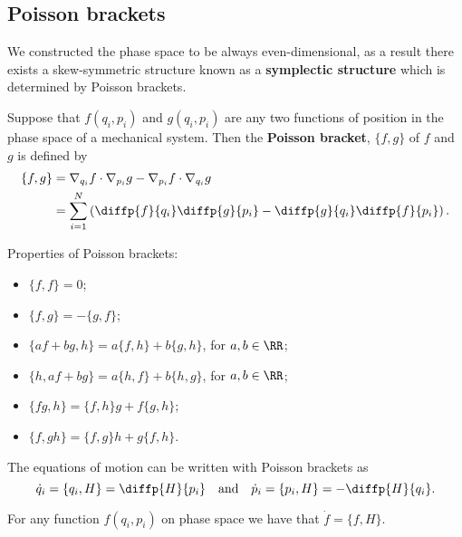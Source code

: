 \documentclass[12pt, a4paper]{article}
\begin{document}
\subsection{Poisson brackets}

We constructed the phase space to be always even-dimensional, as a result there exists a skew-symmetric structure known as a \textbf{symplectic structure} which is determined by Poisson brackets.

\begin{definition}
    Suppose that \(f(q_i,p_i)\) and \(g(q_i,p_i)\) are any two functions of position in the phase space of a mechanical system. Then the \textbf{Poisson bracket}, \(\{f,g\}\) of \(f\) and \(g\) is defined by 
    \[\begin{aligned}
        \{f,g\} &= \nabla_{q_i} f \cdot \nabla_{p_i} g - \nabla_{p_i} f \cdot \nabla_{q_i} g \\
        &= \sum_{i=1}^{N} \left( \diffp{f}{{q_i}} \diffp{g}{{p_i}} -\diffp{g}{{q_i}}\diffp{f}{{p_i}}\right).
    \end{aligned}\]
\end{definition}

\begin{mdthm}
    Properties of Poisson brackets:
    \begin{itemize}
        \item \(\{f,f\}=0\);
        \item \(\{f,g\} = -\{g,f\}\);
        \item \(\{af+bg,h\}=a\{f,h\}+b\{g,h\}\), for \(a,b \in \RR\);
        \item \(\{h,af+bg\}=a\{h,f\}+b\{h,g\}\), for \(a,b \in \RR\);
        \item \(\{fg,h\}=\{f,h\}g+f\{g,h\}\);
        \item \(\{f,gh\} = \{f,g\}h+g\{f,h\}\).
    \end{itemize}
\end{mdthm}

\begin{theorem}
    The equations of motion can be written with Poisson brackets as 
    \[\dot{q}_i = \{q_i,H\} = \diffp{H}{{p_i}} \quad \text{and} \quad \dot{p}_i = \{p_i,H\} = - \diffp{H}{{q_i}}.\]
\end{theorem}

\begin{corollary}
    For any function \(f(q_i,p_i)\) on phase space we have that \(\dot{f} = \{f,H\}.\)
\end{corollary}
\end{document}
